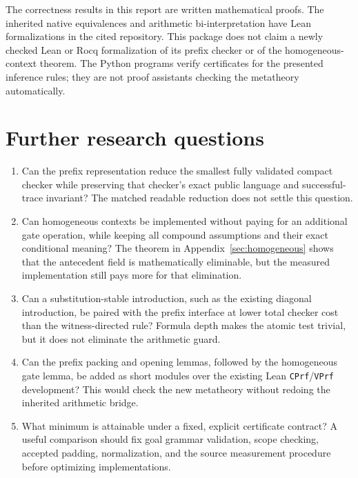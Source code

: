 \documentclass[11pt]{article}
\theoremstyle{definition}\newtheorem{definition}[theorem]{Definition}
\theoremstyle{remark}\newtheorem{remark}[theorem]{Remark}
\newcommand{\code}[1]{\texttt{#1}}
\begin{document}


The correctness results in this report are written mathematical proofs.
The inherited native equivalences and arithmetic bi-interpretation have
Lean formalizations in the cited repository. This package does not claim
a newly checked Lean or Rocq formalization of its prefix checker or of
the homogeneous-context theorem. The Python programs verify certificates
for the presented inference rules; they are not proof assistants checking
the metatheory automatically.

\section{Further research questions}

\begin{enumerate}
\item Can the prefix representation reduce the smallest fully validated
compact checker while preserving that checker's exact public language and
successful-trace invariant? The matched readable reduction does not
settle this question.
\item Can homogeneous contexts be implemented without paying for an
additional gate operation, while keeping all compound assumptions and
their exact conditional meaning? The theorem in Appendix~\ref{sec:homogeneous}
shows that the antecedent field is mathematically eliminable, but the
measured implementation still pays more for that elimination.
\item Can a substitution-stable introduction, such as the existing
diagonal introduction, be paired with the prefix interface at lower total
checker cost than the witness-directed rule? Formula depth makes the
atomic test trivial, but it does not eliminate the arithmetic guard.
\item Can the prefix packing and opening lemmas, followed by the
homogeneous gate lemma, be added as short modules over the existing Lean
\code{CPrf}/\code{VPrf} development? This would check the new metatheory
without redoing the inherited arithmetic bridge.
\item What minimum is attainable under a fixed, explicit certificate
contract? A useful comparison should fix goal grammar validation, scope
checking, accepted padding, normalization, and the source measurement
procedure before optimizing implementations.
\end{enumerate}

\clearpage
\appendix

\end{document}
